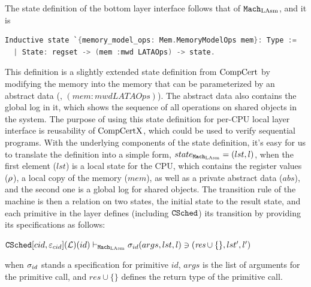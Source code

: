 The state definition of the bottom layer interface follows that of ${\mathrm{\texttt{Mach}}}_{\mathrm{LAsm}}$, and it is
\begin{lstlisting}[language=C]
Inductive state `{memory_model_ops: Mem.MemoryModelOps mem}: Type :=
  | State: regset -> (mem :mwd LATAOps) -> state.
\end{lstlisting}
This definition is a slightly extended state definition from $\mathrm{CompCert}$ by modifying the memory 
into the memory that can be parameterized by an abstract data (\ie, $(mem :mwd LATAOps)$).
The abstract data also contains the global log in it, which shows the sequence of all operations on shared objects in the system. 
The purpose of using this state definition for per-CPU local layer interface is reusability of $\mathrm{CompCertX}$, which could be used to verify sequential programs. 
With the underlying components of the state definition, 
it's easy for us to translate the definition into a simple form, $state_{{\mathrm{\texttt{Mach}}}_{\mathrm{LAsm}}} = (lst, l)$,
when the first element ($lst$) is a local state for the CPU, which contains 
the register values ($\rho$), a local copy of the memory ($mem$), as well as a private abstract data ($abs$),
and the second one is a global log for shared objects.
%
The transition rule of the machine is then a relation on two states, the initial state to the result state, 
and each primitive in the layer defines (including ${{\mathrm{\texttt{CSched}}}}$) its transition by providing its specifications as follows:
\begin{center}
${{\mathrm{\texttt{CSched}}}}[cid, {\varepsilon}_{cid}](\mathcal{L})(id)
 \vdash_{{\mathrm{\texttt{Mach}}}_{\mathrm{LAsm}}}  \sigma_{id}(args, lst, l) \ni (\textit{res}\cup \{\}, lst', l')$
\end{center}
{\noindent}when $\sigma_{id}$ stands a specification for primitive $id$,
$args$ is the list of arguments for the primitive call, and $\textit{res}\cup \{\}$ defines the 
return type of the primitive call.


